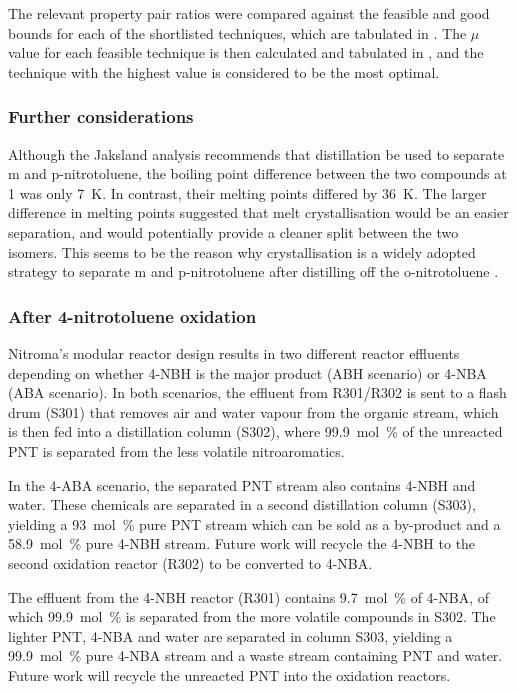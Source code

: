 The relevant property pair ratios were compared against the feasible and good bounds for each of the shortlisted techniques, which are tabulated in . The $\mu$ value for each feasible technique is then calculated and tabulated in , and the technique with the highest value is considered to be the most optimal. 

\subsubsection{Further considerations}
Although the Jaksland analysis recommends that distillation be used to separate m and p-nitrotoluene, the boiling point difference between the two compounds at \SI{1}{\atm} was only \SI{7}{\K}. In contrast, their melting points differed by \SI{36}{\K}. The larger difference in melting points suggested that melt crystallisation would be an easier separation, and would potentially provide a cleaner split between the two isomers. This seems to be the reason why crystallisation is a widely adopted strategy to separate m and p-nitrotoluene after distilling off the o-nitrotoluene \cite{weiland_purification_1931,european_chemical_agency_background_2010}. 


\subsubsection{After 4-nitrotoluene oxidation}

Nitroma's modular reactor design results in two different reactor effluents depending on whether 4-NBH is the major product (ABH scenario) or 4-NBA (ABA scenario). In both scenarios, the effluent from R301/R302 is sent to a flash drum (S301) that removes air and water vapour from the organic stream, which is then fed into a distillation column (S302), where \SI{99.9}{mol\percent} of the unreacted PNT is separated from the less volatile nitroaromatics. 

In the 4-ABA scenario, the separated PNT stream also contains 4-NBH and water. These chemicals are separated in a second distillation column (S303), yielding a \SI{93}{mol\percent} pure PNT stream which can be sold as a by-product and a \SI{58.9}{mol\percent} pure 4-NBH stream. Future work will recycle the 4-NBH to the second oxidation reactor (R302) to be converted to 4-NBA.

The effluent from the 4-NBH reactor (R301) contains \SI{9.7}{mol\percent} of 4-NBA, of which \SI{99.9}{mol\percent} is separated from the more volatile compounds in S302. The lighter PNT, 4-NBA and water are separated in column S303, yielding a \SI{99.9}{mol\percent} pure 4-NBA stream and a waste stream containing PNT and water. Future work will recycle the unreacted PNT into the oxidation reactors.

